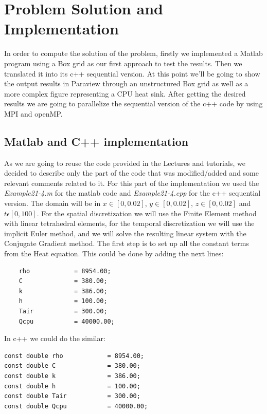 \documentclass[12pt]{article}
\begin{document}
\section{Problem Solution and Implementation}

In order to compute the solution of the problem, firstly we implemented a Matlab program using a Box grid as our first approach to test the results. Then we translated it into its c++ sequential version. At this point we'll be going to show the output results in Paraview through an unstructured Box grid as well as a more complex figure representing a CPU heat sink. After getting the desired results we are going to parallelize the sequential version of the c++ code by using MPI and openMP.

\subsection{Matlab and C++ implementation}
As we are going to reuse the code provided in the Lectures and tutorials, we decided to describe only the part of the code that was modified/added and some relevant comments related to it. For this part of the implementation we used the \textit{Example21-4.m} for the matlab code and \textit{Example21-4.cpp} for the c++ sequential version. The domain will be in $x\in[0,0.02]$, $y\in[0,0.02]$, $z\in[0,0.02]$ and $t\epsilon[0,100]$. For the spatial discretization we will use the Finite Element method with linear tetrahedral elements, for the temporal discretization we will use the implicit Euler method, and we will solve the resulting linear system with the Conjugate Gradient method. The first step is to set up all the constant terms from the Heat equation. This could be done by adding the next lines:

\begin{lstlisting}
    rho            = 8954.00;
    C              = 380.00;
    k              = 386.00;
    h              = 100.00;
    Tair           = 300.00;
    Qcpu           = 40000.00;
\end{lstlisting}

In c++ we could do the similar:

\begin{lstlisting}[style=MyC++Style]
const double rho            = 8954.00;
const double C              = 380.00;
const double k              = 386.00;
const double h              = 100.00;
const double Tair           = 300.00;
const double Qcpu           = 40000.00;
\end{lstlisting}
\end{document}
